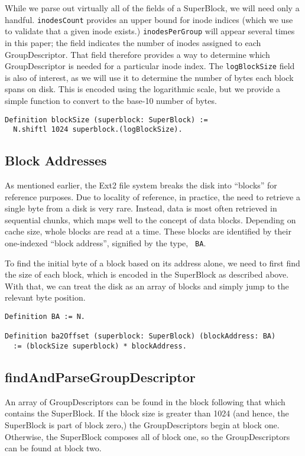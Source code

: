\documentclass[nocopyrightspace]{sigplanconf}
\begin{document}
While we parse out virtually all of the fields of a SuperBlock, we will need
only a handful. {\tt inodesCount} provides an upper bound for inode indices
(which we use to validate that a given inode exists.) {\tt inodesPerGroup}
will appear several times in this paper; the field indicates the number of
inodes assigned to each GroupDescriptor. That field therefore provides a way
to determine which GroupDescriptor is needed for a particular inode index. The
{\tt logBlockSize} field is also of interest, as we will use it to determine
the number of bytes each block spans on disk. This is encoded using the
logarithmic scale, but we provide a simple function to convert to the base-10
number of bytes.

\begin{lstlisting}
Definition blockSize (superblock: SuperBlock) := 
  N.shiftl 1024 superblock.(logBlockSize).
\end{lstlisting}

\subsection{Block Addresses}

As mentioned earlier, the Ext2 file system breaks the disk into ``blocks'' for
reference purposes. Due to locality of reference, in practice, the need to
retrieve a single byte from a disk is very rare. Instead, data is most often
retrieved in sequential chunks, which maps well to the concept of data blocks.
Depending on cache size, whole blocks are read at a time. These blocks are
identified by their one-indexed ``block address'', signified by the type, {\tt
BA}. 

To find the initial byte of a block based on its address alone, we need to
first find the size of each block, which is encoded in the SuperBlock as
described above. With that, we can treat the disk as an array of blocks and
simply jump to the relevant byte position.

\begin{lstlisting}
Definition BA := N.

Definition ba2Offset (superblock: SuperBlock) (blockAddress: BA)
  := (blockSize superblock) * blockAddress.
\end{lstlisting}

\subsection{findAndParseGroupDescriptor}
An array of GroupDescriptors can be found in the block following that which
contains the SuperBlock. If the block size is greater than 1024 (and hence,
the SuperBlock is part of block zero,) the GroupDescriptors begin at block
one. Otherwise, the SuperBlock composes all of block one, so the
GroupDescriptors can be found at block two.
\end{document}
